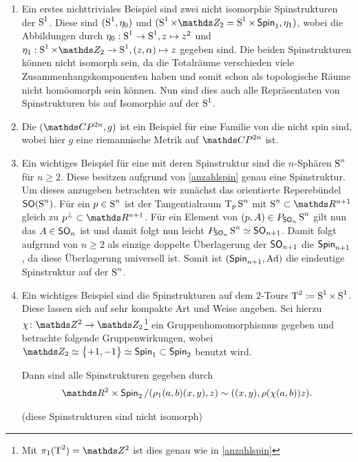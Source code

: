 \begin{Bsp}
\begin{enumerate}[(1)]
  \item Ein erstes nichttriviales Beispiel sind zwei nicht isomorphie
    Spinstrukturen der $\S^1$. Diese sind $(\S^1 , \eta_0)$ und
    $(\S^1 \times \Z_2 = \S^1 \times \spin_1 , \eta_1)$, wobei die
    Abbildungen durch $\eta_0 : \S^1 \rightarrow \S^1 , z \mapsto z^2$
    und
    $\eta_1 : \S^1 \times \Z_2 \rightarrow \S^1 , (z,\alpha) \mapsto
    z$
    gegeben sind. Die beiden Spinstrukturen können nicht isomorph
    sein, da die Totalräume verschieden viele Zusammenhangskomponenten
    haben und somit schon als topologische Räume nicht homöomorph sein
    können. Nun sind dies auch alle Repräsentaten von
    Spinstrukturen bis auf Isomorphie auf der $ \S^1 $.
  \item Die $(\CP^{2n},g)$ ist ein Beispiel für eine Familie von
    \RMFen die nicht spin sind, wobei hier $g$ eine riemannische
    Metrik auf $\CP^{2n}$ ist.  
    
  \item \label{SpinstrSphäre}Ein wichtiges Beispiel für eine \RMF mit deren Spinstruktur
    sind die $ n $-Sphären $\S^n$ für $ n \geq 2 $. Diese besitzen  
    aufgrund von \cref{anzahlspin} genau eine Spinstruktur. Um 
    dieses anzugeben betrachten wir zunächst das orientierte Reperebündel $ \so(\S^n) $. Für ein $ p\in\S^n $ ist der Tangentialraum $ \tang{p}{\S^n} $ mit $ \S^n\subset\R^{n+1} $ 
    gleich zu $ p^\bot\subset\R^{n+1} $. Für ein Element von $ (p,A)\in \Ph{\so_n}{\S^n} $ gilt nun das $ A \in\so_n$ ist und damit folgt
    nun leicht $ \Ph{\so_n}{\S^n} \simeq \so_{n+1} $. Damit folgt
    aufgrund von $ n\geq 2 $ als einzige doppelte Überlagerung der
    $ \so_{n+1} $ die $ \spin_{n+1} $, da diese Überlagerung universell ist. Somit ist $ (\spin_{n+1},\Ad) $ die eindeutige
    Spinstruktur auf der $ \S^n $.
  \item Ein wichtiges Beispiel sind die Spinstrukturen auf dem $ 2 $-Tours $ \TT^2 \coloneqq \S^1\times\S^1$. Diese lassen sich auf sehr
  kompakte Art und Weise angeben.
  Sei hierzu $ \abb{\chi}{\Z^2}{\Z_2}$\footnote{Mit $ \pi_1(\TT^2)=\Z^2 $ ist dies genau wie in \cref{anzahlspin}} ein Gruppenhomomorphismus gegeben
  und betrachte folgende Gruppenwirkungen, wobei $ \Z_2\simeq\sset{+1,-1}\simeq\spin_1 \subset\spin_2 $ benutzt wird.


  Dann sind alle Spinstrukturen gegeben durch  
  \begin{gather*}
  	\R^2 \times \spin_2 / (\rho_1(a,b)(x,y),z) \sim ((x,y),\rho(\chi(a,b))z).
  \end{gather*}
  \begin{smallproof}(diese Spinstrukturen sind nicht isomorph)
  \end{smallproof}
  
	\end{enumerate}
\end{Bsp}

